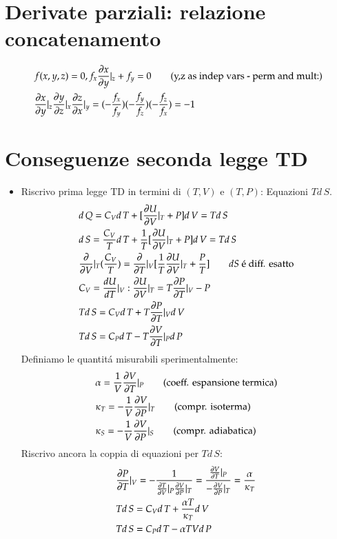         \section{Derivate parziali: relazione concatenamento}
        \begin{align*}
        &f(x,y,z)=0, f_x\PDy{y}{x}|_z+f_y=0\tag{y,z as indep vars - perm and mult:}\\
        &\PDy{y}{x}|_z\PDy{z}{y}|_x\PDy{x}{z}|_y=(-\frac{f_x}{f_y})(-\frac{f_y}{f_z})(-\frac{f_z}{f_x})=-1
        \end{align*}
        \section{Conseguenze seconda legge TD}
        \begin{itemize}
        \item Riscrivo prima legge TD in termini di $(T,V)$ e $(T,P)$: Equazioni $Td\,S$.
        \begin{align*}
        &d\,Q=C_Vd\,T+[\PDy{V}{U}|_T+P]d\,V=Td\,S\\
        &d\,S=\frac{C_V}{T}d\,T+\frac{1}{T}[\PDy{V}{U}|_T+P]d\,V=Td\,S\\
        &\PDof{V}|_T(\frac{C_V}{T})=\PDof{T}|_V[\frac{1}{T}\PDy{V}{U}|_T+\frac{P}{T}]\tag*{$dS$ \'e diff. esatto}\\
        &C_V=\TDy{T}{U}|_V: \PDy{V}{U}|_T=T\PDy{T}{P}|_V-P\\
        &Td\,S=C_Vd\,T+T\PDy{T}{P}|_Vd\,V\\
        &Td\,S=C_Pd\,T-T\PDy{T}{V}|_Pd\,P
        \end{align*}
        Definiamo le quantit\'a misurabili sperimentalmente:
        \begin{align*}
        &\alpha=\frac{1}{V}\PDy{T}{V}|_P\tag{coeff. espansione termica}\\
        &\kappa_T=-\frac{1}{V}\PDy{P}{V}|_T\tag{compr. isoterma}\\
        &\kappa_S=-\frac{1}{V}\PDy{P}{V}|_S\tag{compr. adiabatica}
        \end{align*}
        Riscrivo ancora la coppia di equazioni per $Td\,S$:
        \begin{align*}
        &\PDy{T}{P}|_V=-\frac{1}{\PDy{V}{T}|_P\PDy{P}{V}|_T}=\frac{\PDy{T}{V}|_P}{-\PDy{P}{V}|_T}=\frac{\alpha}{\kappa_T}\\
        &Td\,S=C_Vd\,T+\frac{\alpha T}{\kappa_T}d\,V\\
        &Td\,S=C_Pd\,T-\alpha TVd\,P
        \end{align*}

\end{itemize}
